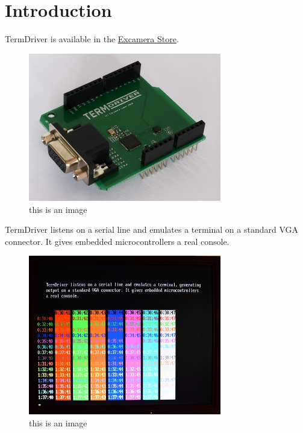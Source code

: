 \documentclass{article}
\begin{document}
\tableofcontents
\listoffigures
\listoftables

\section{Introduction\label{introduction}}

\leavevmode\hypertarget{termdriver}{}%
TermDriver is available in the
\href{http://excamera.com/sphinx/gameduino/store.html}{Excamera Store}.

\begin{figure}[H]
  \centering
  \caption{this is an image}
  \includegraphics[width=0.75\textwidth]{img/img1}
\end{figure}

TermDriver listens on a serial line and emulates a terminal on a
standard VGA connector. It gives embedded microcontrollers a real
console.

\begin{figure}[H]
  \centering
  \caption{this is an image}
  \includegraphics[width=0.75\textwidth]{img/img2}
\end{figure}
\end{document}

